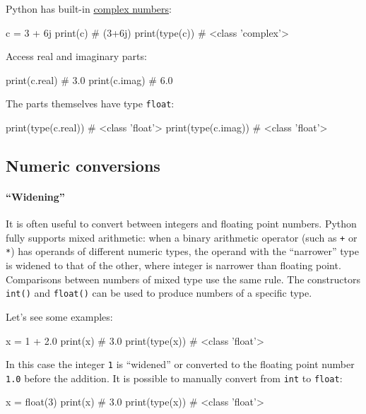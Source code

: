 \documentclass[12pt]{article} \newif\ifsolution\solutiontrue %
\begin{document}
Python has built-in
\href{https://docs.python.org/3/library/stdtypes.html\#typesnumeric}{complex
numbers}:

\begin{python}
c = 3 + 6j
print(c)        # (3+6j)
print(type(c))  # <class 'complex'>
\end{python}

Access real and imaginary parts:

\begin{python}
print(c.real)  # 3.0
print(c.imag)  # 6.0
\end{python}

The parts themselves have type \texttt{float}:

\begin{python}
print(type(c.real))  # <class 'float'>
print(type(c.imag))  # <class 'float'>
\end{python}

\subsection{Numeric conversions}\label{numeric-conversions}

\paragraph{``Widening''}
It is often useful to convert between integers and floating point
numbers. Python fully supports mixed arithmetic: when a binary
arithmetic operator (such as \texttt{+} or \texttt{*}) has operands of
different numeric types, the operand with the ``narrower'' type is
widened to that of the other, where integer is narrower than floating
point. Comparisons between numbers of mixed type use the same rule. The
constructors \texttt{int()} and \texttt{float()} can be used to produce
numbers of a specific type.

Let's see some examples:

\begin{python}
x = 1 + 2.0
print(x)        # 3.0
print(type(x))  # <class 'float'>
\end{python}

In this case the integer \texttt{1} is ``widened'' or converted to the
floating point number \texttt{1.0} before the addition.
It is possible to manually convert from \texttt{int} to \texttt{float}:

\begin{python}
x = float(3)
print(x)        # 3.0
print(type(x))  # <class 'float'>
\end{python}
\end{document}
